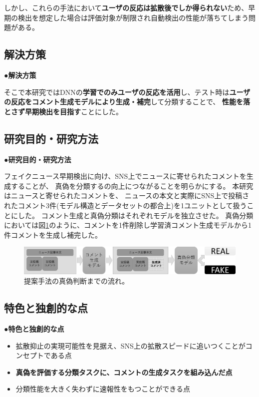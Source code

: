 {	しかし、これらの手法において\textbf{ユーザの反応は拡散後でしか得られない}ため、早期の検出を想定した場合は評価対象が制限され自動検出の性能が落ちてしまう問題がある。

	\subsection{解決方策}
	\noindent
	●\textbf{解決方策}

	そこで本研究ではDNNの\textbf{学習でのみユーザの反応を活用}し、テスト時は\textbf{ユーザの反応をコメント生成モデルにより生成・補完}して分類することで、
	\textbf{性能を落とさず早期検出を目指す}ことにした。

	\subsection{研究目的・研究方法}
	\noindent
	●\textbf{研究目的・研究方法}

	フェイクニュース早期検出に向け、SNS上でニュースに寄せられたコメントを生成することが、
	真偽を分類するの向上につながることを明らかにする。
	本研究はニュースと寄せられたコメントを、
	ニュースの本文と実際にSNS上で投稿されたコメント3件(モデル構造とデータセットの都合上)を1ユニットとして扱うことにした。
	コメント生成と真偽分類はそれぞれモデルを独立させた。
	真偽分類においては図\ref{fig:model}のように、コメントを1件削除し学習済コメント生成モデルから1件コメントを生成し補完した。
	
	\begin{figure}[ht]
		\centering
		\includegraphics[width=0.95\linewidth]{figs/model.pdf}
		\vspace*{-3mm}
		\caption{提案手法の真偽判断までの流れ。}
		\label{fig:model}
	\end{figure}
	\vspace*{-4mm}
	\subsection{特色と独創的な点}
	\noindent
	●\textbf{特色と独創的な点}
	\vspace*{-3mm}
	\begin{itemize}
		\setlength{\parskip}{0cm}
		\setlength{\itemsep}{0cm}
		\item 拡散抑止の実現可能性を見据え、SNS上の拡散スピードに追いつくことがコンセプトである点
		\item \textbf{真偽を評価する分類タスクに、コメントの生成タスクを組み込んだ点}
		\item 分類性能を大きく失わずに速報性をもつことができる点
	\end{itemize}
	\vspace*{-2mm}

}
